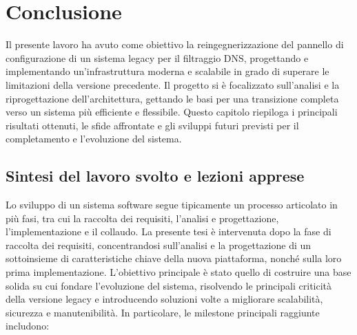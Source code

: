 \chapter{Conclusione}

Il presente lavoro ha avuto come obiettivo la reingegnerizzazione del pannello di configurazione di un sistema legacy per il filtraggio DNS, progettando e implementando un'infrastruttura moderna e scalabile in grado di superare le limitazioni della versione precedente. Il progetto si è focalizzato sull’analisi e la riprogettazione dell’architettura, gettando le basi per una transizione completa verso un sistema più efficiente e flessibile. Questo capitolo riepiloga i principali risultati ottenuti, le sfide affrontate e gli sviluppi futuri previsti per il completamento e l’evoluzione del sistema.

\section{Sintesi del lavoro svolto e lezioni apprese}
Lo sviluppo di un sistema software segue tipicamente un processo articolato in più fasi, tra cui la raccolta dei requisiti, l’analisi e progettazione, l’implementazione e il collaudo. La presente tesi è intervenuta dopo la fase di raccolta dei requisiti, concentrandosi sull'analisi e la progettazione di un sottoinsieme di caratteristiche chiave della nuova piattaforma, nonché sulla loro prima implementazione. L’obiettivo principale è stato quello di costruire una base solida su cui fondare l’evoluzione del sistema, risolvendo le principali criticità della versione legacy e introducendo soluzioni volte a migliorare scalabilità, sicurezza e manutenibilità.
%
In particolare, le milestone principali raggiunte includono:

